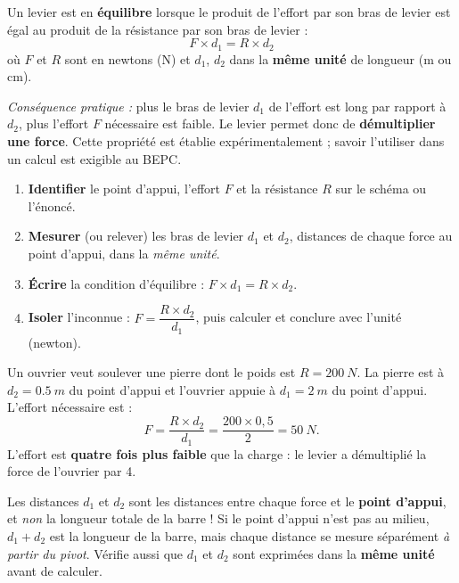 \documentclass[11pt]{article}
\begin{document}
\begin{propriete}
Un levier est en \textbf{équilibre} lorsque le produit de l'effort par son bras de levier est égal au produit de la résistance par son bras de levier :
\[ F \times d_1 = R \times d_2 \]
où $F$ et $R$ sont en newtons (N) et $d_1$, $d_2$ dans la \textbf{même unité} de longueur (m ou cm).

\emph{Conséquence pratique :} plus le bras de levier $d_1$ de l'effort est long par rapport à $d_2$, plus l'effort $F$ nécessaire est faible. Le levier permet donc de \textbf{démultiplier une force}. Cette propriété est établie expérimentalement ; savoir l'utiliser dans un calcul est exigible au BEPC.
\end{propriete}

\begin{methode}
\begin{enumerate}
\item \textbf{Identifier} le point d'appui, l'effort $F$ et la résistance $R$ sur le schéma ou l'énoncé.
\item \textbf{Mesurer} (ou relever) les bras de levier $d_1$ et $d_2$, distances de chaque force au point d'appui, dans la \emph{même unité}.
\item \textbf{Écrire} la condition d'équilibre : $F \times d_1 = R \times d_2$.
\item \textbf{Isoler} l'inconnue : $F = \dfrac{R \times d_2}{d_1}$, puis calculer et conclure avec l'unité (newton).
\end{enumerate}
\end{methode}

\begin{exemplebox}
Un ouvrier veut soulever une pierre dont le poids est $R = \SI{200}{N}$. La pierre est à $d_2 = \SI{0,5}{m}$ du point d'appui et l'ouvrier appuie à $d_1 = \SI{2}{m}$ du point d'appui. L'effort nécessaire est :
\[ F = \frac{R \times d_2}{d_1} = \frac{200 \times 0,5}{2} = \SI{50}{N}. \]
L'effort est \textbf{quatre fois plus faible} que la charge : le levier a démultiplié la force de l'ouvrier par 4.
\end{exemplebox}

\begin{attention}
Les distances $d_1$ et $d_2$ sont les distances entre chaque force et le \textbf{point d'appui}, et \emph{non} la longueur totale de la barre ! Si le point d'appui n'est pas au milieu, $d_1 + d_2$ est la longueur de la barre, mais chaque distance se mesure séparément \emph{à partir du pivot}. Vérifie aussi que $d_1$ et $d_2$ sont exprimées dans la \textbf{même unité} avant de calculer.
\end{attention}
\end{document}
